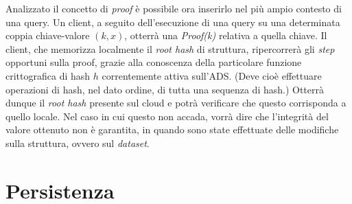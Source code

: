 	
		Analizzato il concetto di \textit{proof} è possibile ora inserirlo nel più ampio contesto di una query. Un client, a seguito dell'esecuzione di una query su una determinata coppia chiave-valore $ (k,x) $, otterrà una \textit{Proof(k)} relativa a quella chiave. Il client, che memorizza localmente il \textit{root hash} di struttura, ripercorrerà gli \textit{step} opportuni sulla proof, grazie alla conoscenza della particolare funzione crittografica di hash $ h $ correntemente attiva sull'ADS. (Deve cioè effettuare operazioni di hash, nel dato ordine, di tutta una sequenza di hash.) Otterrà dunque il \textit{root hash} presente sul cloud e potrà verificare che questo corrisponda a quello locale. Nel caso in cui questo non accada, vorrà dire che l'integrità del valore ottenuto non è garantita, in quando sono state effettuate delle modifiche sulla struttura, ovvero sul \textit{dataset}. 
			
	
\section{Persistenza}


